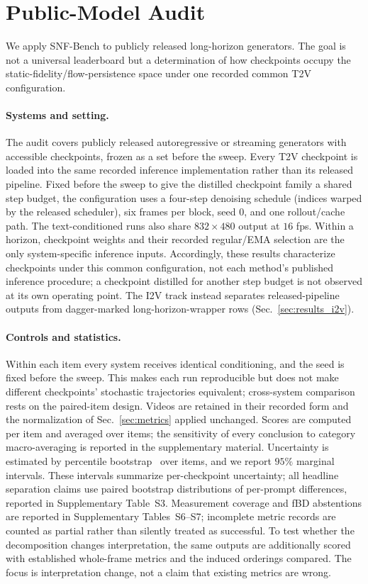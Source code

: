 \section{Public-Model Audit}
\label{sec:audit}

We apply SNF-Bench to publicly released long-horizon generators. The goal is not a universal leaderboard but a determination of how checkpoints occupy the static-fidelity/flow-persistence space under one recorded common T2V configuration.

\paragraph{Systems and setting.}
The audit covers \SNFnPublicTTV{} publicly released autoregressive or streaming generators with accessible checkpoints, frozen as a set before the sweep. Every T2V checkpoint is loaded into the same recorded inference implementation rather than its released pipeline. Fixed before the sweep to give the distilled checkpoint family a shared step budget, the configuration uses a four-step denoising schedule (indices warped by the released scheduler), six frames per block, seed $0$, and one rollout/cache path. The text-conditioned runs also share $832\!\times\!480$ output at $16$ fps. Within a horizon, checkpoint weights and their recorded regular/EMA selection are the only system-specific inference inputs. Accordingly, these results characterize checkpoints under this common configuration, not each method's published inference procedure; a checkpoint distilled for another step budget is not observed at its own operating point. The I2V track instead separates released-pipeline outputs from dagger-marked long-horizon-wrapper rows (Sec.~\ref{sec:results_i2v}).

\paragraph{Controls and statistics.}
Within each item every system receives identical conditioning, and the seed is fixed before the sweep. This makes each run reproducible but does not make different checkpoints' stochastic trajectories equivalent; cross-system comparison rests on the paired-item design. Videos are retained in their recorded form and the normalization of Sec.~\ref{sec:metrics} applied unchanged. Scores are computed per item and averaged over items; the sensitivity of every conclusion to category macro-averaging is reported in the supplementary material. Uncertainty is estimated by percentile bootstrap~\cite{efron1979bootstrap} over items, and we report $95\%$ marginal intervals. These intervals summarize per-checkpoint uncertainty; all headline separation claims use paired bootstrap distributions of per-prompt differences, reported in Supplementary Table~S3. Measurement coverage and fBD abstentions are reported in Supplementary Tables~S6--S7; incomplete metric records are counted as partial rather than silently treated as successful. To test whether the decomposition changes interpretation, the same outputs are additionally scored with established whole-frame metrics and the induced orderings compared. The focus is interpretation change, not a claim that existing metrics are wrong.
